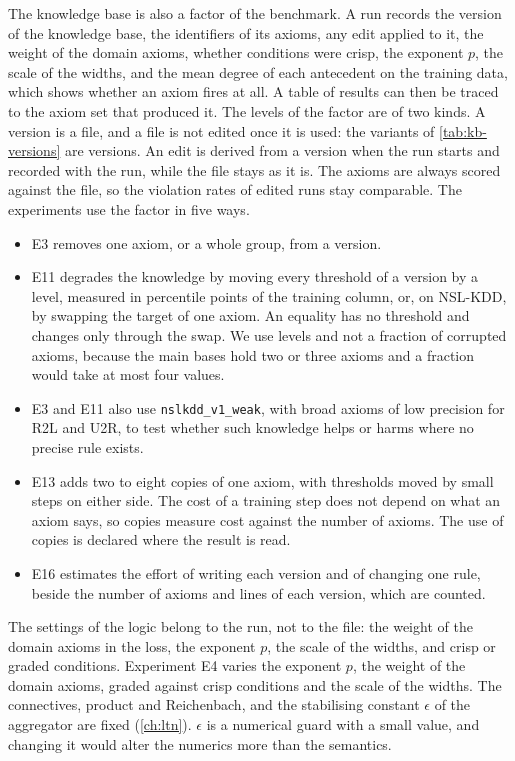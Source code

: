 The knowledge base is also a factor of the benchmark. A run records the version of
the knowledge base, the identifiers of its axioms, any edit applied to it, the weight
of the domain axioms, whether conditions were crisp, the exponent $p$, the scale of
the widths, and the mean degree of each antecedent on the training data, which shows
whether an axiom fires at all. A table of results can then be traced to the axiom
set that produced it. The levels of the factor are of two kinds. A version is a
file, and a file is not edited once it is used: the variants of
\cref{tab:kb-versions} are versions. An edit is derived from a version when the run
starts and recorded with the run, while the file stays as it is. The axioms are
always scored against the file, so the violation rates of edited runs stay
comparable. The experiments use the factor in five ways.
\begin{itemize}
  \item E3 removes one axiom, or a whole group, from a version.
  \item E11 degrades the knowledge by moving every threshold of a version by a
    level, measured in percentile points of the training column, or, on NSL-KDD, by
    swapping the target of one axiom. An equality has no threshold and changes only through the
    swap. We use levels and not a fraction of corrupted axioms, because the main
    bases hold two or three axioms and a fraction would take at most four values.
  \item E3 and E11 also use \texttt{nslkdd\_v1\_weak}, with broad axioms of low
    precision for R2L and U2R, to test whether such knowledge helps or harms where
    no precise rule exists.
  \item E13 adds two to eight copies of one axiom, with thresholds moved by small
    steps on either side. The cost of a training step does not depend on what an
    axiom says, so copies measure cost against the number of axioms. The use of
    copies is declared where the result is read.
  \item E16 estimates the effort of writing each version and of changing one rule,
    beside the number of axioms and lines of each version, which are counted.
\end{itemize}

The settings of the logic belong to the run, not to the file: the weight of the
domain axioms in the loss, the exponent $p$, the scale of the widths, and crisp or
graded conditions. Experiment E4 varies the exponent $p$, the weight of the domain
axioms, graded against crisp conditions and the scale of the widths. The connectives, product and Reichenbach,
and the stabilising constant $\epsilon$ of the aggregator are fixed
(\cref{ch:ltn}). $\epsilon$ is a numerical guard with a small value, and changing
it would alter the numerics more than the semantics.

